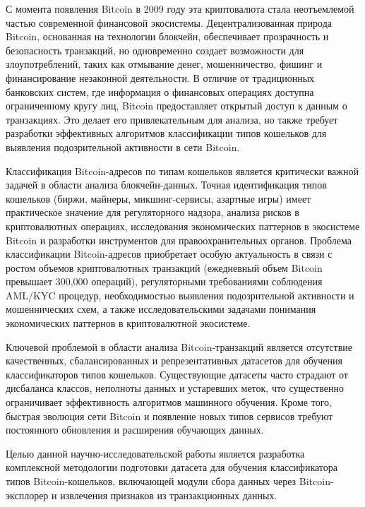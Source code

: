 \introduction %
С момента появления Bitcoin в 2009 году эта криптовалюта стала неотъемлемой частью современной финансовой экосистемы. Децентрализованная природа Bitcoin, основанная на технологии блокчейн, обеспечивает прозрачность и безопасность транзакций, но одновременно создает возможности для злоупотреблений, таких как отмывание денег, мошенничество, фишинг и финансирование незаконной деятельности. В отличие от традиционных банковских систем, где информация о финансовых операциях доступна ограниченному кругу лиц, Bitcoin предоставляет открытый доступ к данным о транзакциях. Это делает его привлекательным для анализа, но также требует разработки эффективных алгоритмов классификации типов кошельков для выявления подозрительной активности в сети Bitcoin.

Классификация Bitcoin-адресов по типам кошельков является критически важной задачей в области анализа блокчейн-данных. Точная идентификация типов кошельков (биржи, майнеры, микшинг-сервисы, азартные игры) имеет практическое значение для регуляторного надзора, анализа рисков в криптовалютных операциях, исследования экономических паттернов в экосистеме Bitcoin и разработки инструментов для правоохранительных органов. Проблема классификации Bitcoin-адресов приобретает особую актуальность в связи с ростом объемов криптовалютных транзакций (ежедневный объем Bitcoin превышает 300,000 операций), регуляторными требованиями соблюдения AML/KYC процедур, необходимостью выявления подозрительной активности и мошеннических схем, а также исследовательскими задачами понимания экономических паттернов в криптовалютной экосистеме.

Ключевой проблемой в области анализа Bitcoin-транзакций является отсутствие качественных, сбалансированных и репрезентативных датасетов для обучения классификаторов типов кошельков. Существующие датасеты часто страдают от дисбаланса классов, неполноты данных и устаревших меток, что существенно ограничивает эффективность алгоритмов машинного обучения. Кроме того, быстрая эволюция сети Bitcoin и появление новых типов сервисов требуют постоянного обновления и расширения обучающих данных.

Целью данной научно-исследовательской работы является разработка комплексной методологии подготовки датасета для обучения классификатора типов Bitcoin-кошельков, включающей модули сбора данных через Bitcoin-эксплорер и извлечения признаков из транзакционных данных.

